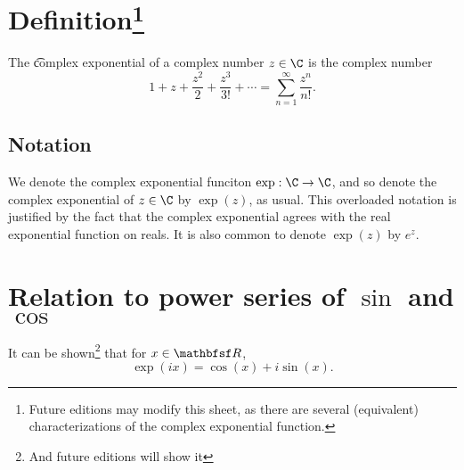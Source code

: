 
\section*{Definition\footnote{Future editions may modify this sheet, as there are several (equivalent) characterizations of the complex exponential function.}}

The \t{complex exponential} of a complex number $z \in \C $ is the complex number
\[
1 + z + \frac{z^2}{2} + \frac{z^3}{3!} + \cdots = \sum_{n = 1}^{\infty}\frac{z^n}{n!}.
\]

\subsection*{Notation}

We denote the complex exponential funciton $\exp: \C  \to \C $, and so denote the complex exponential of $z \in \C $ by $\exp(z)$, as usual.
This overloaded notation is justified by the fact that the complex exponential agrees with the real exponential function on reals.
It is also common to denote $\exp(z)$ by $e^z$.

\section*{Relation to power series of $\sin$ and $\cos$}

It can be shown\footnote{And future editions will show it}
that for $x \in \R $,
\[
\exp(ix) = \cos(x) + i \sin(x).
\]

\blankpage